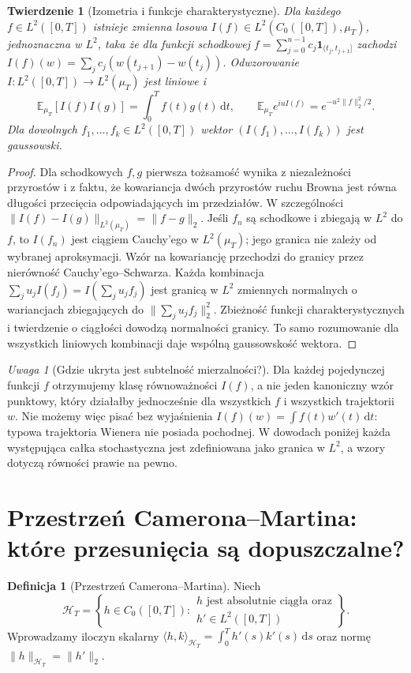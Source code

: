 \documentclass[11pt,a4paper,oneside]{report}
\numberwithin{equation}{chapter}
\theoremstyle{plain}
\newtheorem{twierdzenie}{Twierdzenie}[chapter]
\theoremstyle{definition}
\newtheorem{definicja}{Definicja}[chapter]
\theoremstyle{remark}
\newtheorem{uwaga}{Uwaga}[chapter]
\newcommand{\E}{\mathbb{E}}
\newcommand{\calH}{\mathcal{H}}
\newcommand{\ind}[1]{\mathbf{1}_{#1}}
\newcommand{\dd}{\mathrm{d}}
\begin{document}
\begin{twierdzenie}[Izometria i funkcje charakterystyczne]
\label{th:pw-map}
Dla każdego $f\in L^2([0,T])$ istnieje zmienna losowa
$I(f)\in L^2(C_0([0,T]),\mu_T)$, jednoznaczna w $L^2$,
taka że dla funkcji schodkowej
$f=\sum_{j=0}^{n-1}c_j\ind{(t_j,t_{j+1}]}$ zachodzi
$I(f)(w)=\sum_j c_j(w(t_{j+1})-w(t_j))$.
Odwzorowanie $I:L^2([0,T])\to L^2(\mu_T)$ jest liniowe i
\[
\E_{\mu_T}[I(f)I(g)]=\int_0^T f(t)g(t)\,\dd t,
\qquad
\E_{\mu_T}e^{iuI(f)}=e^{-u^2\|f\|_2^2/2}.
\]
Dla dowolnych $f_1,\ldots,f_k\in L^2([0,T])$ wektor
$(I(f_1),\ldots,I(f_k))$ jest gaussowski.
\end{twierdzenie}
\begin{proof}
Dla schodkowych $f,g$ pierwsza tożsamość wynika z niezależności
przyrostów i z faktu, że kowariancja dwóch przyrostów ruchu Browna
jest równa długości przecięcia odpowiadających im przedziałów.
W szczególności $\|I(f)-I(g)\|_{L^2(\mu_T)}=\|f-g\|_2$.
Jeśli $f_n$ są schodkowe i zbiegają w $L^2$ do $f$,
to $I(f_n)$ jest ciągiem Cauchy'ego w $L^2(\mu_T)$;
jego granica nie zależy od wybranej aproksymacji.
Wzór na kowariancję przechodzi do granicy przez nierówność
Cauchy'ego--Schwarza. Każda kombinacja
$\sum_j u_jI(f_j)=I(\sum_j u_jf_j)$ jest granicą w $L^2$
zmiennych normalnych o wariancjach zbiegających do
$\|\sum_j u_jf_j\|_2^2$. Zbieżność funkcji charakterystycznych
i twierdzenie o ciągłości dowodzą normalności granicy.
To samo rozumowanie dla wszystkich liniowych kombinacji
daje wspólną gaussowskość wektora.
\end{proof}

\begin{uwaga}[Gdzie ukryta jest subtelność mierzalności?]
Dla każdej pojedynczej funkcji $f$ otrzymujemy klasę
równoważności $I(f)$, a nie jeden kanoniczny wzór punktowy,
który działałby jednocześnie dla wszystkich $f$ i wszystkich
trajektorii $w$. Nie możemy więc pisać bez wyjaśnienia
$I(f)(w)=\int f(t)w'(t)\,\dd t$: typowa trajektoria
Wienera nie posiada pochodnej. W dowodach poniżej każda
występująca całka stochastyczna jest zdefiniowana jako
granica w $L^2$, a wzory dotyczą równości prawie na pewno.
\end{uwaga}

\section{Przestrzeń Camerona--Martina: które przesunięcia są dopuszczalne?}

\begin{definicja}[Przestrzeń Camerona--Martina]
\label{def:CMspace}
Niech
\[
\calH_T=\left\{h\in C_0([0,T]):
\begin{array}{l}
 h\text{ jest absolutnie ciągła oraz}\\[-2pt]
 h'\in L^2([0,T])
\end{array}\right\}.
\]
Wprowadzamy iloczyn skalarny
$\langle h,k\rangle_{\calH_T}=\int_0^T h'(s)k'(s)\,\dd s$
oraz normę $\|h\|_{\calH_T}=\|h'\|_2$.
\end{definicja}
\end{document}
